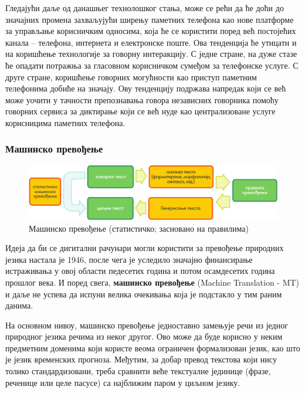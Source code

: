 \begin{multicols}{2}
Гледајући даље од данашњег технолошког стања, може се рећи да ће доћи до значајних промена захваљујући ширењу паметних телефона као нове платформе за управљање корисничким односима, која ће се користити поред већ постојећих канала – телефона, интернета и електронске поште. Ова тенденција ће утицати и на коришћење технологије за говорну интеракцију. С једне стране, на дуже стазе ће опадати потражња за гласовном корисничком сумеђом за телефонске услуге. С друге стране, коришћење говорних могућности као приступ паметним телефонима добиће на значају. Ову тенденцију подржава напредак који се већ може уочити у тачности препознавања говора независних говорника помоћу говорних сервиса за диктирање који се већ нуде као централизоване услуге корисницима паметних телефона. 

 \subsubsection {Машинско превођење}
   

\begin{figure}[htb]
  \center
  \includegraphics[width=\textwidth]{../_media/serbian/machine_translation}
  \caption{Машинско превођење (статистичко; засновано на правилима)}
  \label{fig:mtarch_sr}
\end{figure}

Идеја да би се дигитални рачунари могли користити за превођење природних језика настала је 1946, после чега је уследило значајно финансирање истраживања у овој области педесетих година и потом осамдесетих година прошлог века. И поред свега, \textbf{машинско превођење} (Machine Translation - MT) и даље не успева да испуни велика очекивања која је подстакло у тим раним данима. 


На основном нивоу, машинско превођење једноставно замењује речи из једног природног језика речима из неког другог. Ово може да буде корисно у неким предметним доменима који користе веома ограничен формализован језик, као што је језик временских прогноза. Међутим, за добар превод текстова који нису толико стандардизовани, треба сравнити веће текстуалне јединице (фразе, реченице или целе пасусе) са најближим паром у циљном језику. 


\end{multicols}
